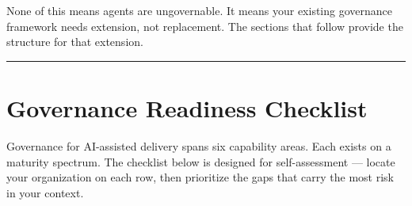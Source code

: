 \documentclass[
  a4paper,
  DIV=11,
  numbers=noendperiod]{scrreprt}
\begin{document}
None of this means agents are ungovernable. It means your existing
governance framework needs extension, not replacement. The sections that
follow provide the structure for that extension.

\begin{center}\rule{0.5\linewidth}{0.5pt}\end{center}

\section{Governance Readiness
Checklist}\label{governance-readiness-checklist}

Governance for AI-assisted delivery spans six capability areas. Each
exists on a maturity spectrum. The checklist below is designed for
self-assessment --- locate your organization on each row, then
prioritize the gaps that carry the most risk in your context.
\end{document}
